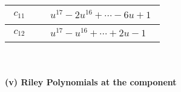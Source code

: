 \documentclass[1p]{elsarticle_modified}
\theoremstyle{definition}
\begin{document}
\begin{tabular}{m{50pt}|m{274pt}}
\hline $$\begin{aligned}c_{11}\end{aligned}$$&$\begin{aligned}
&u^{17}-2 u^{16}+\cdots-6 u+1
\end{aligned}$\\
\hline $$\begin{aligned}c_{12}\end{aligned}$$&$\begin{aligned}
&u^{17}- u^{16}+\cdots+2 u-1
\end{aligned}$\\
\hline
\end{tabular}\\~\\
\newpage\renewcommand{\arraystretch}{1}
\flushleft \textbf{(v) Riley Polynomials at the component}\newline \\
\end{document}
